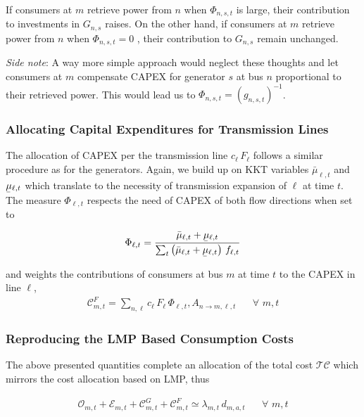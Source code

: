\documentclass[11pt]{article}
\newcommand{\ubar}[1]{\underaccent{\bar}{#1}}
\newcommand{\generation}{g_{n,s,t}}
\newcommand{\capacityGeneration}{G_{n,s}}
\newcommand{\capacityFlow}{F_{\ell}}
\newcommand{\capexFlow}{c_{\ell}}
\newcommand{\demand}[1][n]{d_{#1,a,t}}
\newcommand{\mulowerflow}{\ubar{\mu}_{\ell,t}}
\newcommand{\muupperflow}{\bar{\mu}_{\ell,t}}
\newcommand{\lmp}[1][n]{\lambda_{#1,t}}
\newcommand{\flow}{f_{\ell,t}}
\newcommand{\allocateFlow}{A_{n \rightarrow m,\ell,t}}
\newcommand{\allocateCapexGeneration}{\mathcal{C}^{G}_{m,t}}
\newcommand{\allocateCapexFlow}{\mathcal{C}^{F}_{m,t}}
\newcommand{\allocateOpex}{\mathcal{O}_{m,t}}
\newcommand{\allocateEmissionCost}{\mathcal{E}_{m,t}}
\newcommand{\totalcost}{\mathcal{TC}}
\newcommand{\impactcapexgeneration}{\Phi_{n,s,t}}
\newcommand{\impactcapexflow}{\Phi_{\ell,t}}
\newcommand{\Forall}[1]{\hspace{20pt} \forall \,\, #1}
\begin{document}
\noindent
If consumers at $m$ retrieve power from $n$ when $\impactcapexgeneration$ is large, their contribution to investments in $\capacityGeneration$ raises. On the other hand, if consumers at $m$ retrieve power from $n$ when $\impactcapexgeneration=0$ , their contribution to $\capacityGeneration$ remain unchanged. 

\noindent
\textit{Side note}: A way more simple approach would neglect these thoughts and let  consumers at $m$ compensate CAPEX for generator $s$ at bus $n$ proportional to their retrieved power. This would lead us to $ \impactcapexgeneration = \left( \generation\right)^{-1}$. 

\subsubsection*{Allocating Capital Expenditures for Transmission Lines}
The allocation of CAPEX per the transmission line $\capexFlow \, \capacityFlow $ follows a similar procedure as for the generators. Again, we build up on KKT variables $\muupperflow$ and $\mulowerflow$ which translate to the necessity of transmission expansion of $\ell$ at time $t$. The measure $\impactcapexflow$ respects the need of CAPEX of both flow directions when set to 

\begin{align}
    \impactcapexflow = \dfrac{\muupperflow + \mulowerflow}{\sum_t \left( \muupperflow + \mulowerflow \right) \, \flow}
\end{align}

and weights the contributions of consumers at bus $m$ at time $t$ to the CAPEX in line $\ell$,
\begin{align}
    \allocateCapexFlow = \sum_{n,\ell} \capexFlow \, \capacityFlow\, \impactcapexflow, \allocateFlow \Forall{m,t} \label{eq:allocate_capexFlow}
\end{align}

\subsubsection*{Reproducing the LMP Based Consumption Costs}
The above presented quantities complete an allocation of the total cost $\totalcost$ which mirrors the cost allocation based on LMP, thus 

\begin{align}
 \allocateOpex + \allocateEmissionCost + \allocateCapexGeneration + \allocateCapexFlow \simeq \lmp[m] \, \demand[m] \Forall{m,t} 
 \label{eq:allocated_cost_mirror_lmp}
\end{align}
\end{document}
